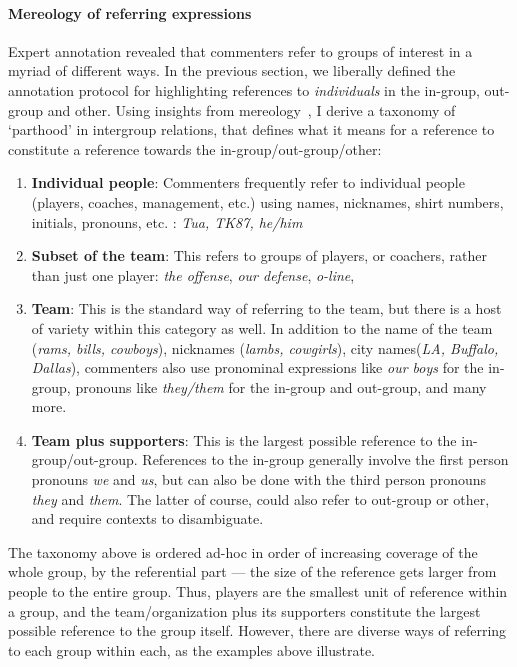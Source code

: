 \paragraph{Mereology of referring expressions} Expert annotation revealed that commenters refer to groups of interest in a myriad of different ways. In the previous section, we liberally defined the annotation protocol for highlighting references to \emph{individuals} in the in-group, out-group and other. Using insights from mereology~\citep{sep-mereology}, I derive a taxonomy of `parthood' in intergroup relations, that defines what it means for a reference to constitute a reference towards the in-group/out-group/other:

\begin{enumerate}
    \item \textbf{Individual people}: Commenters frequently refer to individual people (players, coaches, management, etc.) using names, nicknames, shirt numbers, initials, pronouns, etc. : \emph{Tua, TK87, he/him\textellipsis}
    \item \textbf{Subset of the team}: This refers to groups of players, or coachers, rather than just one player: \emph{the offense}, \emph{our defense}, \emph{o-line}, \textellipsis
    \item \textbf{Team}: This is the standard way of referring to the team, but there is a host of variety within this category as well. In addition to the name of the team (\emph{rams, bills, cowboys}), nicknames (\emph{lambs, cowgirls}), city names(\emph{LA, Buffalo, Dallas}), commenters also use pronominal expressions like \emph{our boys} for the in-group, pronouns like \emph{they/them} for the in-group and out-group, and many more.
    \item \textbf{Team plus supporters}: This is the largest possible reference to the in-group/out-group. References to the in-group generally involve the first person pronouns \emph{we} and \emph{us}, but can also be done with the third person pronouns \emph{they} and \emph{them}. The latter of course, could also refer to out-group or other, and require contexts to disambiguate.
\end{enumerate}

The taxonomy above is ordered ad-hoc in order of increasing coverage of the whole group, by the referential part --- the size of the reference gets larger from people to the entire group. Thus, players are the smallest unit of reference within a group, and the team/organization plus its supporters constitute the largest possible reference to the group itself. However, there are diverse ways of referring to each group within each, as the examples above illustrate.

